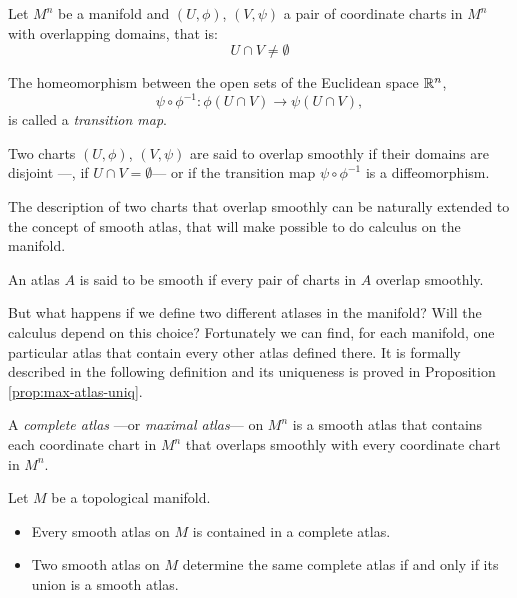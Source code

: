 \begin{definition}
    Let $M^n$ be a manifold and $(U, \phi)$, $(V, \psi)$ a pair of coordinate charts in $M^n$ with overlapping domains, that is:
    \[
        U \cap V \neq \emptyset
    \]

    The homeomorphism between the open sets of the Euclidean space $\mathbb{R}^n$,
    \[
        \psi \circ \phi^{-1} \colon \phi(U \cap V) \to \psi(U \cap V),
    \]
    is called a \emph{transition map}.
\end{definition}

\begin{definition}
    Two charts $(U, \phi)$, $(V, \psi)$ are said to overlap smoothly if their domains are disjoint ---\ie, if $U \cap V  = \emptyset$--- or if the transition map $\psi \circ \phi^{-1}$ is a diffeomorphism.
\end{definition}

The description of two charts that overlap smoothly can be naturally extended to the concept of smooth atlas, that will make possible to do calculus on the manifold.

\begin{definition}
    An atlas $A$ is said to be smooth if every pair of charts in $A$ overlap smoothly.
\end{definition}

But what happens if we define two different atlases in the manifold? Will the calculus depend on this choice? Fortunately we can find, for each manifold, one particular atlas that contain every other atlas defined there. It is formally described in the following definition and its uniqueness is proved in Proposition \autoref{prop:max-atlas-uniq}.

\begin{definition}
    A \emph{complete atlas} ---or \emph{maximal atlas}--- on $M^n$ is a smooth atlas that contains each coordinate chart in $M^n$ that overlaps smoothly with every coordinate chart in $M^n$.
\end{definition}

\begin{proposition}
    Let $M$ be a topological manifold.

    \begin{itemize}
        \item Every smooth atlas on $M$ is contained in a complete atlas.
        \item Two smooth atlas on $M$ determine the same complete atlas if and only if its union is a smooth atlas.
    \end{itemize}
    \label{prop:max-atlas-uniq}
\end{proposition}

